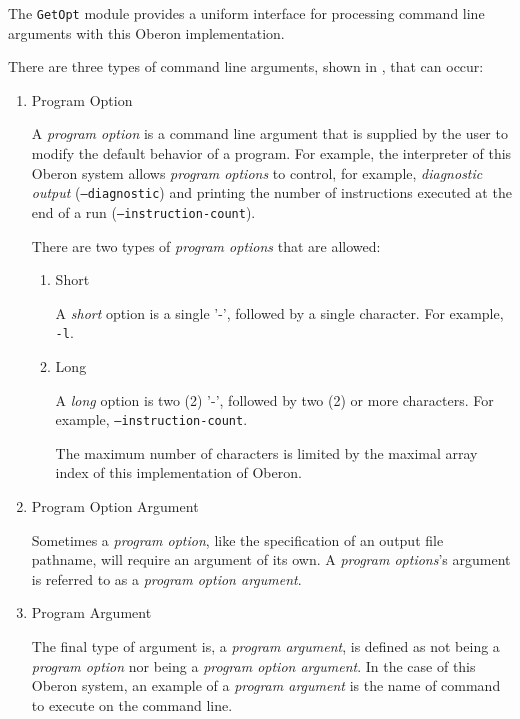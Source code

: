 
The \texttt{GetOpt} module provides a uniform interface for processing
command line arguments with this Oberon implementation.

There are three types of command line arguments, shown in
, that can occur:

\begin{enumerate}
\item Program Option

  A \emph{program option} is a command line argument that is supplied
  by the user to modify the default behavior of a program.  For
  example, the interpreter of this Oberon system allows \emph{program
    options} to control, for example, \emph{diagnostic output}
  (\texttt{--diagnostic}) and printing the number of instructions
  executed at the end of a run (\texttt{--instruction-count}).

  There are two types of \emph{program options} that are allowed:

  \begin{enumerate}
  \item Short\label{getopt:short-option}

    A \emph{short} option is a single '-', followed by a single
    character.  For example, \texttt{-l}.

  \item Long

    A \emph{long} option is two (2) '-', followed by two (2) or more
    characters.  For example, \texttt{--instruction-count}.

    The maximum number of characters is limited by the maximal array
    index of this implementation of Oberon.

  \end{enumerate}

\item Program Option Argument

  Sometimes a \emph{program option}, like the specification of an
  output file pathname, will require an argument of its own.  A
  \emph{program options}'s argument is referred to as a \emph{program
    option argument}.

\item Program Argument

  The final type of argument is, a \emph{program argument}, is defined
  as not being a \emph{program option} nor being a \emph{program
    option argument}.  In the case of this Oberon system, an example
  of a \emph{program argument} is the name of command to execute on
  the command line.
\end{enumerate}

